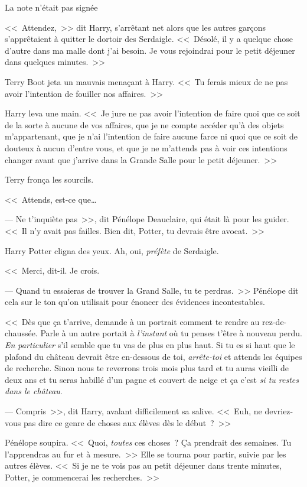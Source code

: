 La note n'était pas signée

\later

<<~Attendez,~>> dit Harry, s'arrêtant net alors que les autres garçons s'apprêtaient à quitter le dortoir des Serdaigle. <<~Désolé, il y a quelque chose d'autre dans ma malle dont j'ai besoin. Je vous rejoindrai pour le petit déjeuner dans quelques minutes.~>>

Terry Boot jeta un mauvais menaçant à Harry. <<~Tu ferais mieux de ne pas avoir l'intention de fouiller nos affaires.~>>

Harry leva une main. <<~Je jure ne pas avoir l'intention de faire quoi que ce soit de la sorte à aucune de vos affaires, que je ne compte accéder qu'à des objets m'appartenant, que je n'ai l'intention de faire aucune farce ni quoi que ce soit de douteux à aucun d'entre vous, et que je ne m'attends pas à voir ces intentions changer avant que j'arrive dans la Grande Salle pour le petit déjeuner.~>>

Terry fronça les sourcils.

<<~Attends, est-ce que…

--- Ne t'inquiète pas~>>, dit Pénélope Deauclaire, qui était là pour les guider. <<~Il n'y avait pas failles. Bien dit, Potter, tu devrais être avocat.~>>

Harry Potter cligna des yeux. Ah, oui, \emph{préfète} de Serdaigle.

<<~Merci, dit-il. Je crois.

--- Quand tu essaieras de trouver la Grand Salle, tu te perdras.~>> Pénélope dit cela sur le ton qu'on utilisait pour énoncer des évidences incontestables.

<<~Dès que ça t'arrive, demande à un portrait comment te rendre au rez-de-chaussée. Parle à un autre portait à \emph{l'instant} où tu penses t'être à nouveau perdu. \emph{En particulier} s'il semble que tu vas de plus en plus haut. Si tu es si haut que le plafond du château devrait être en-dessous de toi, \emph{arrête-toi} et attends les équipes de recherche. Sinon nous te reverrons trois mois plus tard et tu auras vieilli de deux ans et tu seras habillé d'un pagne et couvert de neige et ça c'est \emph{si tu restes dans le château}.

--- Compris~>>, dit Harry, avalant difficilement sa salive. <<~Euh, ne devriez-vous pas dire ce genre de choses aux élèves dès le début~?~>>

Pénélope soupira. <<~Quoi, \emph{toutes} ces choses~? Ça prendrait des semaines. Tu l'apprendras au fur et à mesure.~>> Elle se tourna pour partir, suivie par les autres élèves. <<~Si je ne te vois pas au petit déjeuner dans trente minutes, Potter, je commencerai les recherches.~>>

